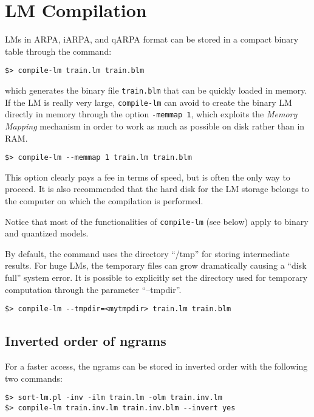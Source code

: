 \documentclass[11pt]{article}
\begin{document}
\newpage
\section{LM Compilation}
LMs in ARPA, iARPA, and qARPA format can be stored in a compact binary table through the command:

\begin{verbatim}
$> compile-lm train.lm train.blm
\end{verbatim}

\noindent
which generates the binary file {\tt train.blm} that can be quickly loaded in memory.  If the LM
is really very large, {\tt compile-lm} can avoid to create the binary LM directly in memory through the 
option {\tt -memmap 1}, which exploits the {\em Memory Mapping} mechanism in order to work as 
much as possible on disk rather than in RAM. \\

\begin{verbatim}
$> compile-lm --memmap 1 train.lm train.blm
\end{verbatim}
\noindent
This option clearly pays a fee  in terms of speed, but  is often the only way to proceed. It is also recommended 
that the hard disk for the LM storage belongs to the computer on which the compilation is performed.

\noindent
Notice that most of the functionalities of {\tt compile-lm} (see below) apply to binary and quantized models. 

\noindent
By default, the command uses the directory ``/tmp'' for storing
intermediate results.  For huge LMs, the temporary files can grow
dramatically causing a ``disk full'' system error.  It is possible to
explicitly set the directory used for temporary computation through the
parameter ``--tmpdir''.
\begin{verbatim}
$> compile-lm --tmpdir=<mytmpdir> train.lm train.blm
\end{verbatim}


\subsection{Inverted order of ngrams}
\label{sec:inverted-lm}
For a faster access, the ngrams can be stored in inverted order with the following two commands:
\begin{verbatim}
$> sort-lm.pl -inv -ilm train.lm -olm train.inv.lm
$> compile-lm train.inv.lm train.inv.blm --invert yes
\end{verbatim}
\end{document}
